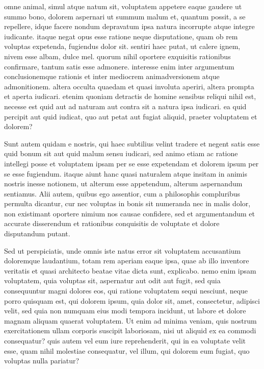  omne animal, simul atque natum sit, voluptatem appetere eaque gaudere ut summo bono, dolorem aspernari ut summum malum et, quantum possit, a se repellere, idque facere nondum depravatum ipsa natura incorrupte atque integre iudicante. itaque negat opus esse ratione neque disputatione, quam ob rem voluptas expetenda, fugiendus dolor sit. sentiri haec putat, ut calere ignem, nivem esse albam, dulce mel. quorum nihil oportere exquisitis rationibus confirmare, tantum satis esse admonere. interesse enim inter argumentum conclusionemque rationis et inter mediocrem animadversionem atque admonitionem. altera occulta quaedam et quasi involuta aperiri, altera prompta et aperta iudicari. etenim quoniam detractis de homine sensibus reliqui nihil est, necesse est quid aut ad naturam aut contra sit a natura ipsa iudicari. ea quid percipit aut quid iudicat, quo aut petat aut fugiat aliquid, praeter voluptatem et dolorem?

 Sunt autem quidam e nostris, qui haec subtilius velint tradere et negent satis esse quid bonum sit aut quid malum sensu iudicari, sed animo etiam ac ratione intellegi posse et voluptatem ipsam per se esse expetendam et dolorem ipsum per se esse fugiendum. itaque aiunt hanc quasi naturalem atque insitam in animis nostris inesse notionem, ut alterum esse appetendum, alterum aspernandum sentiamus. Alii autem, quibus ego assentior, cum a philosophis compluribus permulta dicantur, cur nec voluptas in bonis sit numeranda nec in malis dolor, non existimant oportere nimium nos causae confidere, sed et argumentandum et accurate disserendum et rationibus conquisitis de voluptate et dolore disputandum putant.

 Sed ut perspiciatis, unde omnis iste natus error sit voluptatem accusantium doloremque laudantium, totam rem aperiam eaque ipsa, quae ab illo inventore veritatis et quasi architecto beatae vitae dicta sunt, explicabo. nemo enim ipsam voluptatem, quia voluptas sit, aspernatur aut odit aut fugit, sed quia consequuntur magni dolores eos, qui ratione voluptatem sequi nesciunt, neque porro quisquam est, qui dolorem ipsum, quia dolor sit, amet, consectetur, adipisci velit, sed quia non numquam eius modi tempora incidunt, ut labore et dolore magnam aliquam quaerat voluptatem. Ut enim ad minima veniam, quis nostrum exercitationem ullam corporis suscipit laboriosam, nisi ut aliquid ex ea commodi consequatur? quis autem vel eum iure reprehenderit, qui in ea voluptate velit esse, quam nihil molestiae consequatur, vel illum, qui dolorem eum fugiat, quo voluptas nulla pariatur?

